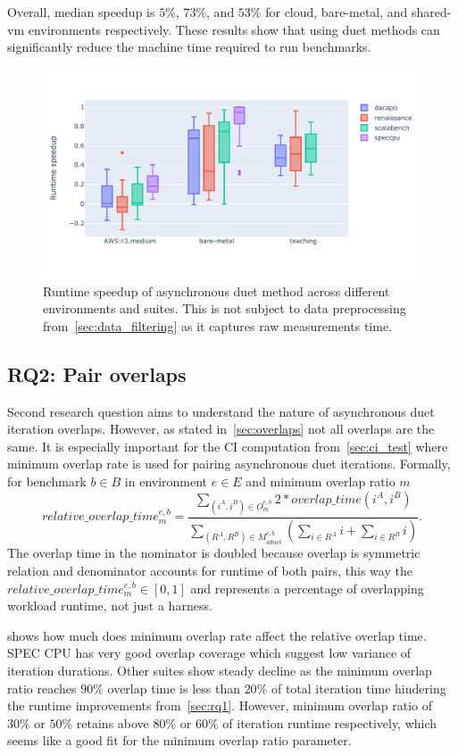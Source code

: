 Overall, median speedup is $5\%$, $73\%$, and $53\%$ for cloud, bare-metal, and shared-vm environments respectively.
These results show that using duet methods can significantly reduce the machine time required to run benchmarks.

\begin{figure}
	\centering
	\includegraphics[width=.9\linewidth]{./figures/runtime_speedup.pdf}
	\caption{
		Runtime speedup of asynchronous duet method across different environments and suites.
		This is not subject to data preprocessing from~\cref{sec:data_filtering} as it captures raw measurements time.
	}
	\label{fig:runtime_speedup}
\end{figure}

\subsection{RQ2: Pair overlaps}
\label{sec:rq2}

Second research question aims to understand the nature of asynchronous duet iteration overlaps.
However, as stated in~\cref{sec:overlaps} not all overlaps are the same.
It is especially important for the CI computation from~\ref{sec:ci_test} where minimum overlap rate is used for pairing asynchronous duet iterations.
Formally, for benchmark $b \in B$ in environment $e \in E$ and minimum overlap ratio $m$
$$
relative\_overlap\_time^{e, b}_m = \frac{\sum\limits_{(i^A, i^B) \in O^{e,b}_m} 2 * overlap\_time(i^A, i^B)}{\sum\limits_{(R^A, R^B) \in M^{e, b}_{aduet}}(\sum\limits_{i \in R^A} i + \sum\limits_{i \in R^B} i)}.
$$
The overlap time in the nominator is doubled because overlap is symmetric relation and denominator accounts for runtime of both pairs, this way the $relative\_overlap\_time^{e, b}_m \in [0, 1]$ and represents a percentage of overlapping workload runtime, not just a harness.

 shows how much does minimum overlap rate affect the relative overlap time.
SPEC CPU has very good overlap coverage which suggest low variance of iteration durations.
Other suites show steady decline as the minimum overlap ratio reaches $90\%$ overlap time is less than $20\%$ of total iteration time hindering the runtime improvements from~\cref{sec:rq1}.
However, minimum overlap ratio of $30\%$ or $50\%$ retains above $80\%$ or $60\%$ of iteration runtime respectively, which seems like a good fit for the minimum overlap ratio parameter.

